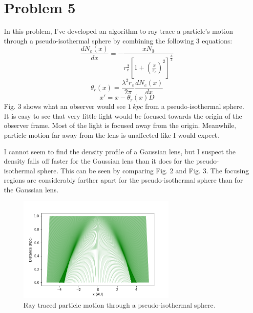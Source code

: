 \documentclass[12pt, letterpaper]{article}
\begin{document}
\section{ Problem 5}
In this problem, I've developed an algorithm to ray trace a particle's motion through a pseudo-isothermal sphere by combining the following $3$ equations:
\begin{equation}
\frac{d N_e(x)}{dx} = -\frac{x N_0}{r_c^2 [1 + (\frac{x}{r_c})^2]^{\frac{3}{2}}}
\end{equation}
\begin{equation}
\theta_r(x) = \frac{\lambda^2 r_e }{2 \pi} \frac{d N_e(x)}{dx}
\end{equation}
\begin{equation}
x' = x - \theta_r(x) D
\end{equation}
Fig. 3 shows what an observer would see $1\ kpc$ from a pseudo-isothermal sphere.  It is easy to see that very little light would be focused towards the origin of the observer frame. Most of the light is focused away from the origin. Meanwhile, particle motion far away from the lens is unaffected like I would expect.

I cannot seem to find the density profile of a Gaussian lens, but I suspect the density falls off faster for the Gaussian lens than it does for the pseudo-isothermal sphere. This can be seen by comparing Fig. 2 and Fig. 3. The focusing regions are considerably farther apart for the pseudo-isothermal sphere than for the Gaussian lens. 
\begin{figure}[h]
\caption{Ray traced particle motion through a pseudo-isothermal sphere.}
\centering
\includegraphics[width=0.7\textwidth]{pseudo_isothermal_sphere}
\end{figure}
\end{document}
